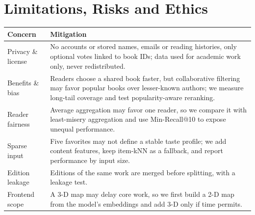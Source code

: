 \section*{Limitations, Risks and Ethics}

{\tablestyle
\begin{xltabular}{\linewidth}{@{}L{2.5cm}Y@{}}
\toprule
\textbf{Concern} & \textbf{Mitigation} \\
\midrule
Privacy \& license & No accounts or stored names, emails or reading histories, only optional votes linked to book IDs; data used for academic work only, never redistributed. \\
Benefits \& bias & Readers choose a shared book faster, but collaborative filtering may favor popular books over lesser-known authors; we measure long-tail coverage and test popularity-aware reranking. \\
Reader fairness & Average aggregation may favor one reader, so we compare it with least-misery aggregation and use Min-Recall@10 to expose unequal performance. \\
Sparse input & Five favorites may not define a stable taste profile; we add content features, keep item-kNN as a fallback, and report performance by input size. \\
Edition leakage & Editions of the same work are merged before splitting, with a leakage test. \\
Frontend scope & A 3-D map may delay core work, so we first build a 2-D map from the model's embeddings and add 3-D only if time permits. \\
\bottomrule
\end{xltabular}}
